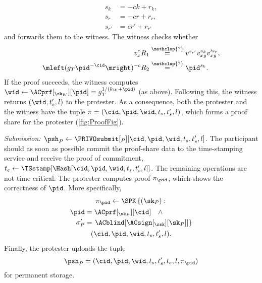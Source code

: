 \begin{align*}
s_k &= -ck + r_k, \\
s_r &= -cr + r_r, \\
s_{r'} &= cr' + r_{r'}
\end{align*}
and forwards them to the witness.
The witness checks whether
\begin{align*}
  v_x^c R_1 &\overset{\mathclap{?}}{=} v^{s_{r'}} v_{xy}^{s_k} v_{xy}^{\prime 
    s_r}, \\
  \mleft(g_T \pid^{-\cid}\mright)^{-c} R_2 &\overset{\mathclap{?}}{=} 
  \pid^{s_k}.
\end{align*}
If the proof succeeds, the witness computes \(\wid\gets \ACprf[_{\sk_W}][\pid] = g_T^{1/(k_W+\pid)}\) (as above).
Following this, the witness returns \((\wid, t_s', l)\) to the protester.
As a consequence, both the protester and the witness have the tuple \(\pi = 
  (\cid, \pid, \wid, t_s, t_s', l)\), which forms a proof share for the 
protester (\cref{fig:ProofFig}).


\emph{Submission: \(\psh_P\gets \PRIVOsubmit[_P][\cid, \pid, \wid, t_s, t_s',  l]\).}
The participant should as soon as possible commit the proof-share data to the 
time-stamping service and receive the proof of commitment, \(t_e\gets 
  \TSstamp[\Hash[\cid, \pid, \wid, t_s, t_s', l]]\).
The remaining operations are not time critical.
The protester computes  proof \(\pi_{\pid}\), which shows the correctness of \(\pid\).
More specifically,
\begin{multline*}
  \pi_{\pid}\gets \SPK\left\{ (\sk_P) : \right. \\
    \begin{aligned}
      \pid &= \ACprf[_{\sk_P}][\cid] \quad \land \\
      \sigma_P' &= \left. \ACblind[\ACsign[_{\ssk}][\sk_P]] \right\}
    \end{aligned} \\
      (\cid, \pid, \wid, t_s, t_s', l).
\end{multline*}
Finally, the protester uploads the tuple \[  \psh_P = (\cid, \pid, \wid, t_s, t_s', t_e, l, \pi_{\pid})\] for permanent storage.

